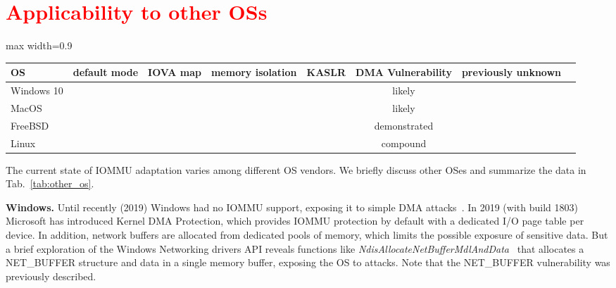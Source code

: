 
\section{\textcolor{red}{Applicability to other OSs}}\label{sec:other_os}

\begin{table*}[t]
\begin{adjustbox}{max width=0.9\textwidth}
\begin{tabular}{l|ccccccc}
OS                           & default mode & IOVA map   & memory isolation    & KASLR &  DMA Vulnerability & previously unknown          \\ \hline

Windows 10  & \V   & \V & \X & \V   & likely        &    \\
MacOS       & \V   & \X & \X & \V   & likely        &    \\
FreeBSD     & \X   & \V & \X & \V   & demonstrated  &    \\
Linux       & \V   & \V & \X & \V   & compound      & \V \\\hline       
\end{tabular}
\end{adjustbox}
  \caption{IOMMU adaptation in different OS's.}
  \label{tab:other_os}
\end{table*}

The current state of IOMMU adaptation varies among different OS vendors. We briefly discuss other OSes and summarize the data in Tab.~\ref{tab:other_os}. 

\smallskip
\noindent\textbf{Windows.} Until recently (2019) Windows had no IOMMU support, exposing it to simple DMA attacks~\cite{thunder}.
In 2019 (with build 1803) Microsoft has introduced Kernel DMA Protection\cite{ms_iommu}, which provides IOMMU protection by default with a dedicated I/O page table per device. 
In addition, network buffers are allocated from dedicated pools of memory, which limits the possible exposure of sensitive data. But a brief exploration of the Windows Networking drivers API reveals functions like \emph{NdisAllocateNetBufferMdlAndData}~\cite{ms_single} that allocates a NET\_BUFFER structure and data in a single memory buffer, exposing the OS to \simple attacks. Note that the NET\_BUFFER vulnerability was previously described\cite{thunder}. 

